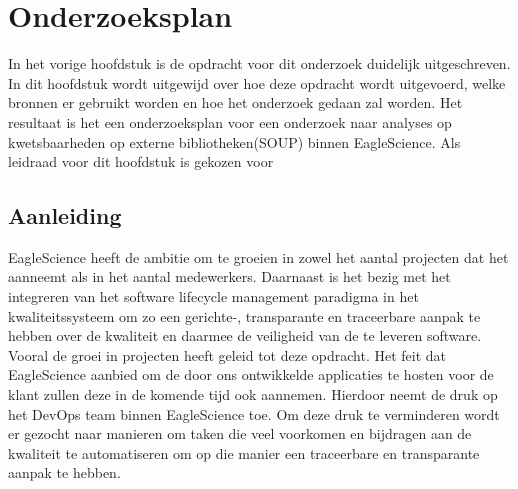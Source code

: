 \chapter{Onderzoeksplan}\label{ch:onderzoekPlan}

In het vorige hoofdstuk is de opdracht voor dit onderzoek duidelijk uitgeschreven. In dit hoofdstuk wordt uitgewijd over hoe deze opdracht wordt uitgevoerd, welke bronnen er gebruikt worden en hoe het onderzoek gedaan zal worden. Het resultaat is het een onderzoeksplan voor een onderzoek naar analyses op kwetsbaarheden op externe bibliotheken(SOUP) binnen EagleScience. Als leidraad voor dit hoofdstuk is gekozen voor \cite{JanLeen2017}

\section{Aanleiding}\label{sec:OP_aanleiding}
EagleScience heeft de ambitie om te groeien in zowel het aantal projecten dat het aanneemt als in het aantal medewerkers. Daarnaast is het bezig met het integreren van het software lifecycle management paradigma in het kwaliteitssysteem om zo een gerichte-, transparante en traceerbare aanpak te hebben over de kwaliteit en daarmee de veiligheid van de te leveren software. Vooral de groei in projecten heeft geleid tot deze opdracht. Het feit dat EagleScience aanbied om de door ons ontwikkelde applicaties te hosten voor de klant zullen deze in de komende tijd ook aannemen. Hierdoor neemt de druk op het DevOps team binnen EagleScience toe. Om deze druk te verminderen wordt er gezocht naar manieren om taken die veel voorkomen en bijdragen aan de kwaliteit te automatiseren om op die manier een traceerbare en transparante aanpak te hebben.

